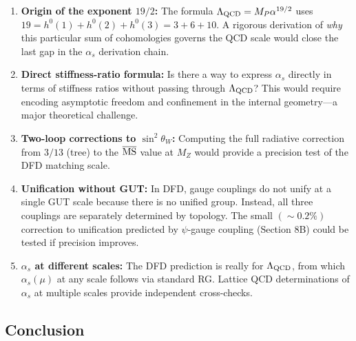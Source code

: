 \begin{enumerate}
\item \textbf{Origin of the exponent $19/2$:} The formula $\Lambda_{\rm QCD} = M_P \alpha^{19/2}$
uses $19 = h^0(1) + h^0(2) + h^0(3) = 3 + 6 + 10$. A rigorous derivation of \emph{why}
this particular sum of cohomologies governs the QCD scale would close the last gap
in the $\alpha_s$ derivation chain.

\item \textbf{Direct stiffness-ratio formula:} Is there a way to express $\alpha_s$ directly
in terms of stiffness ratios without passing through $\Lambda_{\rm QCD}$? This would require
encoding asymptotic freedom and confinement in the internal geometry---a major theoretical
challenge.

\item \textbf{Two-loop corrections to $\sin^2\theta_W$:} Computing the full radiative correction
from $3/13$ (tree) to the $\overline{\rm MS}$ value at $M_Z$ would provide a precision test
of the DFD matching scale.

\item \textbf{Unification without GUT:} In DFD, gauge couplings do not unify at a single
GUT scale because there is no unified group. Instead, all three couplings are separately
determined by topology. The small $(\sim 0.2\%)$ correction to unification predicted by
$\psi$-gauge coupling (Section 8B) could be tested if precision improves.

\item \textbf{$\alpha_s$ at different scales:} The DFD prediction is really for
$\Lambda_{\rm QCD}$, from which $\alpha_s(\mu)$ at any scale follows via standard RG.
Lattice QCD determinations of $\alpha_s$ at multiple scales provide independent cross-checks.
\end{enumerate}

\subsection{Conclusion}

